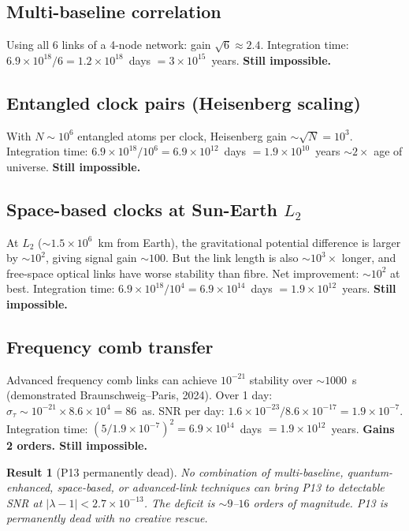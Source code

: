 \documentclass[11pt]{article}
\newtheorem{result}{Result}
\newcommand{\ee}[1]{\times 10^{#1}}
\newcommand{\lbone}{|\lambda - 1|}
\begin{document}
\subsection{Multi-baseline correlation}

Using all 6 links of a 4-node network: gain $\sqrt{6} \approx 2.4$.
Integration time: $6.9\ee{18}/6 = 1.2\ee{18}$~days $= 3\ee{15}$~years.
\textbf{Still impossible.}

\subsection{Entangled clock pairs (Heisenberg scaling)}

With $N \sim 10^6$ entangled atoms per clock, Heisenberg gain
$\sim \sqrt{N} = 10^3$. Integration time: $6.9\ee{18}/10^6 =
6.9\ee{12}$~days $= 1.9\ee{10}$~years $\sim 2\times$ age of universe.
\textbf{Still impossible.}

\subsection{Space-based clocks at Sun-Earth $L_2$}

At $L_2$ ($\sim 1.5\ee{6}$~km from Earth), the gravitational
potential difference is larger by $\sim 10^2$, giving signal gain
$\sim 100$. But the link length is also $\sim 10^3 \times$ longer,
and free-space optical links have worse stability than fibre.
Net improvement: $\sim 10^2$ at best. Integration time:
$6.9\ee{18}/10^4 = 6.9\ee{14}$~days $= 1.9\ee{12}$~years.
\textbf{Still impossible.}

\subsection{Frequency comb transfer}

Advanced frequency comb links can achieve $10^{-21}$ stability
over $\sim 1000$~s (demonstrated Braunschweig--Paris, 2024).
Over 1 day: $\sigma_\tau \sim 10^{-21} \times 8.6\ee{4} = 86$~as.
SNR per day: $1.6\ee{-23}/8.6\ee{-17} = 1.9\ee{-7}$.
Integration time: $(5/1.9\ee{-7})^2 = 6.9\ee{14}$~days
$= 1.9\ee{12}$~years. \textbf{Gains 2 orders. Still impossible.}

\begin{result}[P13 permanently dead]
No combination of multi-baseline, quantum-enhanced, space-based,
or advanced-link techniques can bring P13 to detectable SNR at
$\lbone < 2.7\ee{-13}$. The deficit is $\sim 9$--$16$ orders of
magnitude. P13 is permanently dead with no creative rescue.
\end{result}
\end{document}
